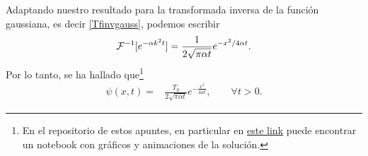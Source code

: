 Adaptando nuestro resultado para la transformada inversa de la función gaussiana, es decir \eqref{Tfinvgauss}, podemos escribir
\begin{align}
{\cal F}^{-1}[e^{-\alpha k^2 t}] = \frac{1}{2\sqrt{\pi\alpha t}}e^{-x^2/4\alpha t}.
\end{align}
Por lo tanto, se ha hallado que\footnote{En el repositorio de estos apuntes, en particular en \href{https://github.com/gfrubi/FM2/blob/master/Notebooks/Ejemplo-Difusion-Calor-1D.ipynb}{este link} puede encontrar un notebook con gráficos y animaciones de la solución.}
\begin{align}
\psi(x,t)=&\frac{T_{0}}{2\sqrt{\pi \alpha t}}e^{-\frac{x^2}{4 \alpha t}},\qquad \forall t>0.
\end{align}
